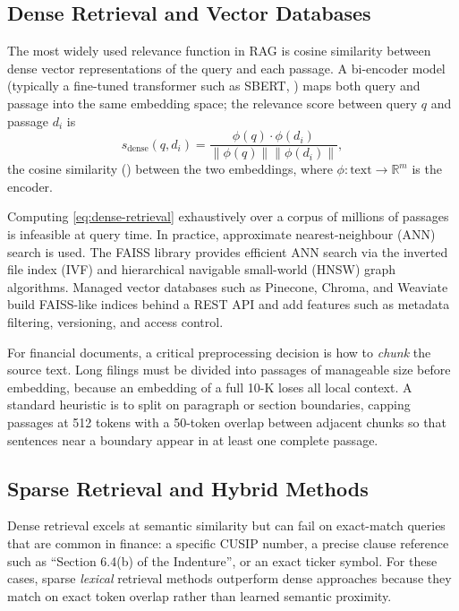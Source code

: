\begin{context}
\subsection{Dense Retrieval and Vector Databases}
\label{sec:rag-dense}

The most widely used relevance function in RAG is cosine similarity between dense
vector representations of the query and each passage.  A bi-encoder model (typically
a fine-tuned transformer such as SBERT, \citet{reimers2019}) maps both
query and passage into the same embedding space; the relevance score between query
$q$ and passage $d_i$ is
\begin{equation}
  s_{\text{dense}}(q, d_i) = \frac{\phi(q) \cdot \phi(d_i)}{\|\phi(q)\| \|\phi(d_i)\|},
  \label{eq:dense-retrieval}
\end{equation}
the cosine similarity () between the two embeddings, where
$\phi : \text{text} \to \mathbb{R}^m$ is the encoder.

Computing \eqref{eq:dense-retrieval} exhaustively over a corpus of millions of passages
is infeasible at query time.  In practice, approximate nearest-neighbour (ANN)
search is used.  The FAISS library \citep{johnson2019billion} provides efficient
ANN search via the inverted file index (IVF) and hierarchical navigable small-world
(HNSW) graph algorithms.  Managed vector databases such as Pinecone, Chroma, and
Weaviate build FAISS-like indices behind a REST API and add features such as
metadata filtering, versioning, and access control.

For financial documents, a critical preprocessing decision is how to \emph{chunk}
the source text.  Long filings must be divided into passages of manageable size before
embedding, because an embedding of a full 10-K loses all local context.  A standard
heuristic is to split on paragraph or section boundaries, capping passages at 512
tokens with a 50-token overlap between adjacent chunks so that sentences near a
boundary appear in at least one complete passage.

\subsection{Sparse Retrieval and Hybrid Methods}
\label{sec:rag-sparse}

Dense retrieval excels at semantic similarity but can fail on exact-match queries
that are common in finance: a specific CUSIP number, a precise clause reference such
as ``Section 6.4(b) of the Indenture'', or an exact ticker symbol.  For these cases,
sparse \emph{lexical} retrieval methods outperform dense approaches because they
match on exact token overlap rather than learned semantic proximity.


\end{context}
